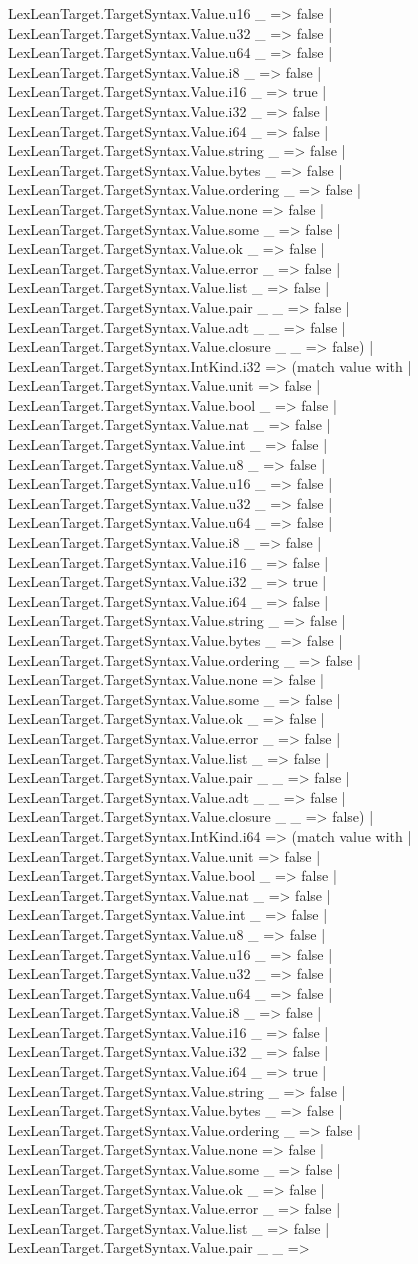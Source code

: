 \documentclass[11pt]{article}
\begin{document}
LexLeanTarget.TargetSyntax.Value.u16 \_ => false | LexLeanTarget.TargetSyntax.Value.u32 \_ => false | LexLeanTarget.TargetSyntax.Value.u64 \_ => false | LexLeanTarget.TargetSyntax.Value.i8 \_ => false | LexLeanTarget.TargetSyntax.Value.i16 \_ => true | LexLeanTarget.TargetSyntax.Value.i32 \_ => false | LexLeanTarget.TargetSyntax.Value.i64 \_ => false | LexLeanTarget.TargetSyntax.Value.string \_ => false | LexLeanTarget.TargetSyntax.Value.bytes \_ => false | LexLeanTarget.TargetSyntax.Value.ordering \_ => false | LexLeanTarget.TargetSyntax.Value.none => false | LexLeanTarget.TargetSyntax.Value.some \_ => false | LexLeanTarget.TargetSyntax.Value.ok \_ => false | LexLeanTarget.TargetSyntax.Value.error \_ => false | LexLeanTarget.TargetSyntax.Value.list \_ => false | LexLeanTarget.TargetSyntax.Value.pair \_ \_ => false | LexLeanTarget.TargetSyntax.Value.adt \_ \_ => false | LexLeanTarget.TargetSyntax.Value.closure \_ \_ => false) | LexLeanTarget.TargetSyntax.IntKind.i32 => (match value with | LexLeanTarget.TargetSyntax.Value.unit => false | LexLeanTarget.TargetSyntax.Value.bool \_ => false | LexLeanTarget.TargetSyntax.Value.nat \_ => false | LexLeanTarget.TargetSyntax.Value.int \_ => false | LexLeanTarget.TargetSyntax.Value.u8 \_ => false | LexLeanTarget.TargetSyntax.Value.u16 \_ => false | LexLeanTarget.TargetSyntax.Value.u32 \_ => false | LexLeanTarget.TargetSyntax.Value.u64 \_ => false | LexLeanTarget.TargetSyntax.Value.i8 \_ => false | LexLeanTarget.TargetSyntax.Value.i16 \_ => false | LexLeanTarget.TargetSyntax.Value.i32 \_ => true | LexLeanTarget.TargetSyntax.Value.i64 \_ => false | LexLeanTarget.TargetSyntax.Value.string \_ => false | LexLeanTarget.TargetSyntax.Value.bytes \_ => false | LexLeanTarget.TargetSyntax.Value.ordering \_ => false | LexLeanTarget.TargetSyntax.Value.none => false | LexLeanTarget.TargetSyntax.Value.some \_ => false | LexLeanTarget.TargetSyntax.Value.ok \_ => false | LexLeanTarget.TargetSyntax.Value.error \_ => false | LexLeanTarget.TargetSyntax.Value.list \_ => false | LexLeanTarget.TargetSyntax.Value.pair \_ \_ => false | LexLeanTarget.TargetSyntax.Value.adt \_ \_ => false | LexLeanTarget.TargetSyntax.Value.closure \_ \_ => false) | LexLeanTarget.TargetSyntax.IntKind.i64 => (match value with | LexLeanTarget.TargetSyntax.Value.unit => false | LexLeanTarget.TargetSyntax.Value.bool \_ => false | LexLeanTarget.TargetSyntax.Value.nat \_ => false | LexLeanTarget.TargetSyntax.Value.int \_ => false | LexLeanTarget.TargetSyntax.Value.u8 \_ => false | LexLeanTarget.TargetSyntax.Value.u16 \_ => false | LexLeanTarget.TargetSyntax.Value.u32 \_ => false | LexLeanTarget.TargetSyntax.Value.u64 \_ => false | LexLeanTarget.TargetSyntax.Value.i8 \_ => false | LexLeanTarget.TargetSyntax.Value.i16 \_ => false | LexLeanTarget.TargetSyntax.Value.i32 \_ => false | LexLeanTarget.TargetSyntax.Value.i64 \_ => true | LexLeanTarget.TargetSyntax.Value.string \_ => false | LexLeanTarget.TargetSyntax.Value.bytes \_ => false | LexLeanTarget.TargetSyntax.Value.ordering \_ => false | LexLeanTarget.TargetSyntax.Value.none => false | LexLeanTarget.TargetSyntax.Value.some \_ => false | LexLeanTarget.TargetSyntax.Value.ok \_ => false | LexLeanTarget.TargetSyntax.Value.error \_ => false | LexLeanTarget.TargetSyntax.Value.list \_ => false | LexLeanTarget.TargetSyntax.Value.pair \_ \_ => 
\end{document}
